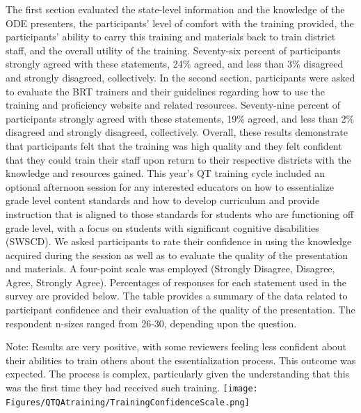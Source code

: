 \documentclass[]{article}
\begin{document}
The first section evaluated the state-level information and the
knowledge of the ODE presenters, the participants' level of comfort with
the training provided, the participants' ability to carry this training
and materials back to train district staff, and the overall utility of
the training. Seventy-six percent of participants strongly agreed with
these statements, 24\% agreed, and less than 3\% disagreed and strongly
disagreed, collectively. In the second section, participants were asked
to evaluate the BRT trainers and their guidelines regarding how to use
the training and proficiency website and related resources. Seventy-nine
percent of participants strongly agreed with these statements, 19\%
agreed, and less than 2\% disagreed and strongly disagreed,
collectively. Overall, these results demonstrate that participants felt
that the training was high quality and they felt confident that they
could train their staff upon return to their respective districts with
the knowledge and resources gained. This year's QT training cycle
included an optional afternoon session for any interested educators on
how to essentialize grade level content standards and how to develop
curriculum and provide instruction that is aligned to those standards
for students who are functioning off grade level, with a focus on
students with significant cognitive disabilities (SWSCD). We asked
participants to rate their confidence in using the knowledge acquired
during the session as well as to evaluate the quality of the
presentation and materials. A four-point scale was employed (Strongly
Disagree, Disagree, Agree, Strongly Agree). Percentages of responses for
each statement used in the survey are provided below. The table provides
a summary of the data related to participant confidence and their
evaluation of the quality of the presentation. The respondent n-sizes
ranged from 26-30, depending upon the question.

Note: Results are very positive, with some reviewers feeling less
confident about their abilities to train others about the
essentialization process. This outcome was expected. The process is
complex, particularly given the understanding that this was the first
time they had received such training. \FloatBarrier
\texttt{[image: Figures/QTQAtraining/TrainingConfidenceScale.png]}
\end{document}

